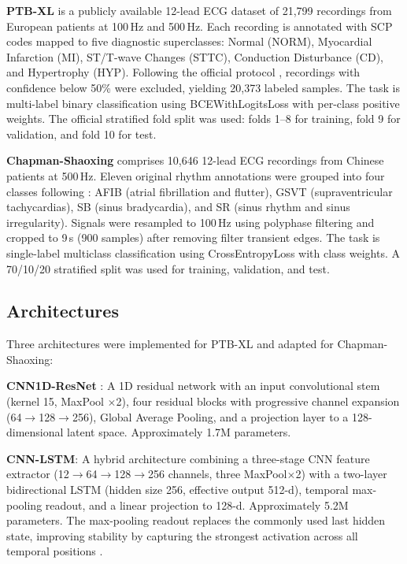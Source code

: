 \documentclass[journal]{IEEEtran}
\begin{document}
\textbf{PTB-XL} \cite{wagner2020ptbxl} is a publicly available 12-lead ECG dataset of 21,799 recordings from European patients at 100\,Hz and 500\,Hz. Each recording is annotated with SCP codes mapped to five diagnostic superclasses: Normal (NORM), Myocardial Infarction (MI), ST/T-wave Changes (STTC), Conduction Disturbance (CD), and Hypertrophy (HYP). Following the official protocol \cite{wagner2020ptbxl}, recordings with confidence below 50\% were excluded, yielding 20,373 labeled samples. The task is multi-label binary classification using BCEWithLogitsLoss with per-class positive weights. The official stratified fold split was used: folds 1--8 for training, fold 9 for validation, and fold 10 for test.

\textbf{Chapman-Shaoxing} \cite{zheng2020chapman} comprises 10,646 12-lead ECG recordings from Chinese patients at 500\,Hz. Eleven original rhythm annotations were grouped into four classes following \cite{zheng2020chapman}: AFIB (atrial fibrillation and flutter), GSVT (supraventricular tachycardias), SB (sinus bradycardia), and SR (sinus rhythm and sinus irregularity). Signals were resampled to 100\,Hz using polyphase filtering and cropped to 9\,s (900 samples) after removing filter transient edges. The task is single-label multiclass classification using CrossEntropyLoss with class weights. A 70/10/20 stratified split was used for training, validation, and test.

\subsection{Architectures}

Three architectures were implemented for PTB-XL and adapted for Chapman-Shaoxing:

\textbf{CNN1D-ResNet} \cite{he2016resnet}: A 1D residual network with an input convolutional stem (kernel 15, MaxPool $\times$2), four residual blocks with progressive channel expansion (64$\to$128$\to$256), Global Average Pooling, and a projection layer to a 128-dimensional latent space. Approximately 1.7M parameters.

\textbf{CNN-LSTM}: A hybrid architecture combining a three-stage CNN feature extractor (12$\to$64$\to$128$\to$256 channels, three MaxPool$\times$2) with a two-layer bidirectional LSTM (hidden size 256, effective output 512-d), temporal max-pooling readout, and a linear projection to 128-d. Approximately 5.2M parameters. The max-pooling readout replaces the commonly used last hidden state, improving stability by capturing the strongest activation across all temporal positions \cite{sun2024cnnlstm, mahajan2025graph}.
\end{document}
